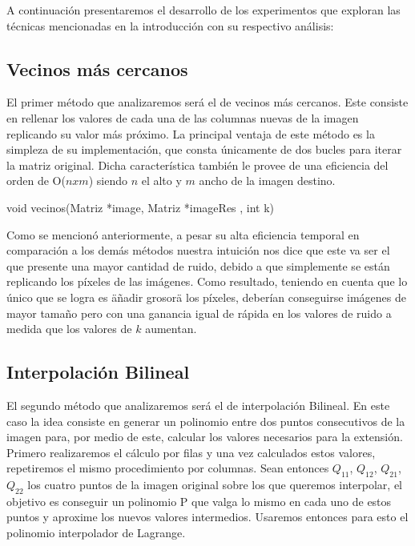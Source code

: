 A continuación presentaremos el desarrollo de los experimentos que exploran las técnicas mencionadas en la introducción con su respectivo análisis:

\subsection{Vecinos más cercanos}
El primer método que analizaremos será el de vecinos más cercanos. Este consiste en rellenar los valores de cada una de las columnas
nuevas de la imagen replicando su valor más próximo. La principal ventaja de este método es la simpleza de su implementación, que consta únicamente de dos bucles para iterar la matriz original. Dicha característica también le provee de una eficiencia del orden de O($nxm$) siendo $n$ el alto y $m$ ancho de la imagen destino.

\begin{algorithm}[H]
\begin{algorithmic}[1]\parskip=1mm
\caption{void vecinos(Matriz *image, Matriz *imageRes , int k)}
    \ENDFOR
\ENDFOR
\end{algorithmic}
\end{algorithm}

Como se mencionó anteriormente, a pesar su alta eficiencia temporal en comparación a los demás métodos nuestra intuición nos dice que este va ser el que presente una mayor cantidad de ruido, debido a que simplemente se están replicando los píxeles de las imágenes. Como resultado, teniendo en cuenta que lo único que se logra es \"añadir grosor\" a los píxeles, deberían conseguirse imágenes de mayor tamaño pero con una ganancia igual de rápida en los valores de ruido a medida que los valores de $k$ aumentan.

\subsection{Interpolación Bilineal}
El segundo método que analizaremos será el de interpolación Bilineal. En este caso la idea consiste en generar un polinomio entre
dos puntos consecutivos de la imagen para, por medio de este, calcular los valores necesarios para la extensión. \\
Primero realizaremos el cálculo por filas y una vez calculados estos valores, repetiremos el mismo procedimiento por columnas.
Sean entonces $Q_{11}$, $Q_{12}$, $Q_{21}$, $Q_{22}$ los cuatro puntos de la imagen original sobre los que queremos interpolar, el objetivo es conseguir un polinomio P que valga lo mismo en cada uno de estos puntos y aproxime los nuevos valores intermedios. Usaremos entonces para esto el polinomio interpolador de Lagrange.

